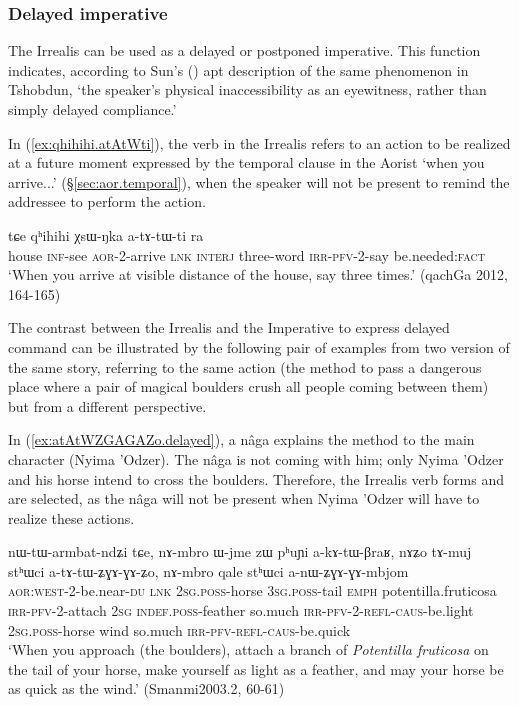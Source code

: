  
\subsubsection{Delayed imperative} \label{sec:irrealis.delayed.imp}
The Irrealis can be used as a delayed or postponed imperative. This function indicates, according to Sun's (\citeyear[809]{jackson07irrealis}) apt description of the same phenomenon in Tshobdun, `the  speaker’s  physical  inaccessibility  as  an  eyewitness,  rather  than  simply  delayed  compliance.'

In (\ref{ex:qhihihi.atAtWti}), the verb in the Irrealis  refers to an action to be realized at a future moment expressed by the temporal clause in the Aorist  `when you arrive...' (§\ref{sec:aor.temporal}), when the speaker will not be present to remind the addressee to perform the action.

\begin{exe}
\ex \label{ex:qhihihi.atAtWti}
 tɕe qʰihihi χsɯ-ŋka a-tɤ-tɯ-ti ra \\
house \textsc{inf}-see \textsc{aor}-2-arrive \textsc{lnk} \textsc{interj} three-word \textsc{irr}-\textsc{pfv}-2-say be.needed:\textsc{fact} \\
\glt `When you arrive at visible distance of the house, say  three times.' (qachGa 2012, 164-165)
\end{exe}

The contrast between the Irrealis and the Imperative to express delayed command can be illustrated by the following pair of examples from two version of the same story, referring to the same action (the method to pass a dangerous place where a pair of magical boulders crush all people coming between them) but from a different perspective. 

In (\ref{ex:atAtWZGAGAZo.delayed}), a nâga explains the method to the main character (Nyima 'Odzer). The nâga is not coming with him; only Nyima 'Odzer and his horse intend to cross the boulders. Therefore, the Irrealis verb forms  and  are selected, as the nâga will not be present when Nyima 'Odzer will have to realize these actions. 

\begin{exe}
\ex \label{ex:atAtWZGAGAZo.delayed}
\gll nɯ-tɯ-armbat-ndʑi tɕe, nɤ-mbro ɯ-jme zɯ pʰuɲi a-kɤ-tɯ-βraʁ, nɤʑo tɤ-muj stʰɯci a-tɤ-tɯ-ʑɣɤ-ɣɤ-ʑo, nɤ-mbro qale stʰɯci a-nɯ-ʑɣɤ-ɣɤ-mbjom \\
\textsc{aor}:\textsc{west}-2-be.near-\textsc{du} \textsc{lnk} \textsc{2sg}.\textsc{poss}-horse \textsc{3sg}.\textsc{poss}-tail \textsc{emph} potentilla.fruticosa \textsc{irr}-\textsc{pfv}-2-attach \textsc{2sg} \textsc{indef}.\textsc{poss}-feather so.much \textsc{irr}-\textsc{pfv}-2-\textsc{refl}-\textsc{caus}-be.light \textsc{2sg}.\textsc{poss}-horse wind so.much \textsc{irr}-\textsc{pfv}-\textsc{refl}-\textsc{caus}-be.quick \\
\glt `When you approach (the boulders), attach a branch of \textit{Potentilla fruticosa} on the tail of your horse, make yourself as light as a feather, and may your horse be as quick as the wind.' (Smanmi2003.2, 60-61)
\end{exe}

